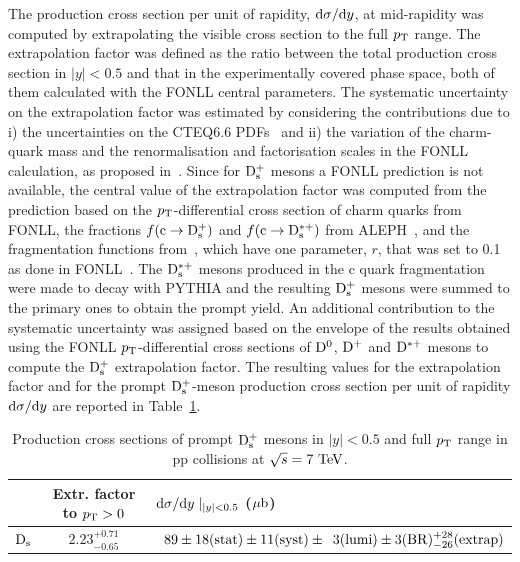 The production cross section per unit of rapidity, ${\rm d}\sigma/{\rm d}y$, 
at mid-rapidity was computed by extrapolating the 
visible cross section to the full $p_{\rm T}$ range.
The extrapolation factor was defined as
the ratio between the total production cross section in $|y|<0.5$ and that 
in the experimentally covered phase space, both of them calculated with the
FONLL central parameters. 
The systematic uncertainty on the extrapolation factor was estimated by
considering the contributions due to i) the uncertainties on the 
CTEQ6.6 PDFs~\cite{Pumplin:2002vw} and ii) the variation of the charm-quark 
mass and the renormalisation and factorisation scales in the FONLL 
calculation, as proposed in~\cite{Cacciari:2012ny}.
Since for ${\rm D_s^+}$ mesons a FONLL prediction is not available,
the central value of the extrapolation factor was computed 
from the prediction based on the $p_{\rm T}$-differential cross section of charm 
quarks from FONLL, the fractions $f({\rm c\rightarrow {\rm D_s^+}})$ and 
$f({\rm c\rightarrow D_{\rm s}^{*+}})$ from ALEPH~\cite{Barate:1999bg}, and the 
fragmentation functions from~\cite{Braaten:1994bz}, which have one parameter, 
$r$, that was set to 0.1 as done in FONLL~\cite{Cacciari:2003zu}.
The ${\rm D}_{\rm s}^{*+}$ mesons produced in the c quark fragmentation were 
made to decay with PYTHIA and the resulting ${\rm D_s^+}$ mesons were summed to the 
primary ones to obtain the prompt yield.
An additional contribution to the systematic uncertainty  was assigned
based on the envelope of the results obtained using the 
FONLL $p_{\rm T}$-differential cross sections of ${\rm D^0}$, 
${\rm D^+}$ and ${\rm D^{*+}}$ mesons to compute the ${\rm D_s^+}$ extrapolation factor.
The resulting values for the extrapolation factor and for the prompt ${\rm D_s^+}$-meson 
production cross section per unit of rapidity ${\rm d}\sigma/{\rm d}y$ are 
reported in Table~\ref{tab:dsdy}.
\begin{table}[!h]
\centering
\begin{tabular}{c|c|l} 
 & Extr. factor to $p_{\rm T}>0$ & ${\rm d}\sigma/{\rm d}y \mid_{|y|<0.5}$ ($\mathrm{\mu b}$) \\
\hline
\rule{0pt}{12pt} 
${\rm D_s}$     & $2.23^{+0.71}_{-0.65}$ &  $\phantom{0}89 \pm 18 ({\rm stat}) \pm 11 ({\rm syst}) \pm \phantom{0}3 ({\rm lumi}) \pm 3 ({\rm BR})^{+28}_{-26} ({\rm extrap})$\\[1ex]
\hline
\end{tabular}
\caption{Production cross sections of prompt ${\rm D_s^+}$ mesons in $|y| < 0.5$ and full $p_{\rm T}$ range in pp collisions at $\sqrt{s} = 7~\mathrm{TeV}$.}
\label{tab:dsdy}
\end{table}
